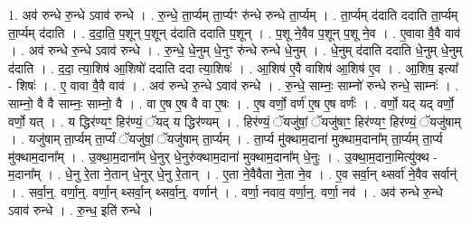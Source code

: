 \documentclass[17pt]{extarticle}
\begin{document}
1. अव॑ रुन्धे रु॒न्धे ऽवाव॑ रुन्धे । . रु॒न्धे॒ ता॒र्प्यम् ता॒र्प्यꣳ रु॑न्धे रुन्धे ता॒र्प्यम् । . ता॒र्प्यम् द॑दाति ददाति ता॒र्प्यम् ता॒र्प्यम् द॑दाति । . द॒दा॒ति॒ प॒शून् प॒शून् द॑दाति ददाति प॒शून् । . प॒शू ने॒वैव प॒शून् प॒शू ने॒व । . ए॒वावा वै॒वै वाव॑ । . अव॑ रुन्धे रु॒न्धे ऽवाव॑ रुन्धे । . रु॒न्धे॒ धे॒नुम् धे॒नुꣳ रु॑न्धे रुन्धे धे॒नुम् । . धे॒नुम् द॑दाति ददाति धे॒नुम् धे॒नुम् द॑दाति । . द॒दा॒ त्या॒शिष॑ आ॒शिषो॑ ददाति ददा त्या॒शिषः॑ । . आ॒शिष॑ ए॒वै वाशिष॑ आ॒शिष॑ ए॒व । . आ॒शिष॒ इत्या᳚ - शिषः॑ । . ए॒ वावा वै॒वै वाव॑ । . अव॑ रुन्धे रु॒न्धे ऽवाव॑ रुन्धे । . रु॒न्धे॒ साम्नः॒ साम्नो॑ रुन्धे रुन्धे॒ साम्नः॑ । . साम्नो॒ वै वै साम्नः॒ साम्नो॒ वै । . वा ए॒ष ए॒ष वै वा ए॒षः । . ए॒ष वर्णो॒ वर्ण॑ ए॒ष ए॒ष वर्णः॑ । . वर्णो॒ यद् यद् वर्णो॒ वर्णो॒ यत् । . य द्धिर॑ण्यꣳ॒॒ हिर॑ण्यं॒ ॅयद् य द्धिर॑ण्यम् । . हिर॑ण्यं॒ ॅयजु॑षां॒ ॅयजु॑षाꣳ॒॒ हिर॑ण्यꣳ॒॒ हिर॑ण्यं॒ ॅयजु॑षाम् । . यजु॑षाम् ता॒र्प्यम् ता॒र्प्यं ॅयजु॑षां॒ ॅयजु॑षाम् ता॒र्प्यम् । . ता॒र्प्य मु॑क्थाम॒दाना॑ मुक्थाम॒दाना᳚म् ता॒र्प्यम् ता॒र्प्य मु॑क्थाम॒दाना᳚म् । . उ॒क्था॒म॒दाना᳚म् धे॒नुर् धे॒नुरु॑क्थाम॒दाना॑ मुक्थाम॒दाना᳚म् धे॒नुः । . उ॒क्था॒म॒दाना॒मित्यु॑क्थ - म॒दाना᳚म् । . धे॒नु रे॒ता ने॒तान् धे॒नुर् धे॒नु रे॒तान् । . ए॒ता ने॒वैवैता ने॒ता ने॒व । . ए॒व सर्वा॒न् थ्सर्वा॑ ने॒वैव सर्वान्॑ । . सर्वा॒न्॒. वर्णा॒न्॒. वर्णा॒न् थ्सर्वा॒न् थ्सर्वा॒न्॒. वर्णान्॑ । . वर्णा॒ नवाव॒ वर्णा॒न्॒. वर्णा॒ नव॑ । . अव॑ रुन्धे रु॒न्धे ऽवाव॑ रुन्धे । . रु॒न्ध॒ इति॑ रुन्धे । \newline
\end{document}

